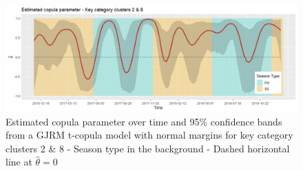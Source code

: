 \begin{figure}[H]
\centering
  \includegraphics[width=0.95\linewidth]{figures/estimated_theta_kcc_28.png}
  \caption{Estimated copula parameter over time and 95\% confidence bands from a \ac{GJRM} t-copula model with normal margins for key category clusters 2 \& 8 - Season type in the background - Dashed horizontal line at $\hat{\theta} = 0$}
  \label{fig:estimated_theta_kcc_28}
\end{figure}














%
%
%
%
%



